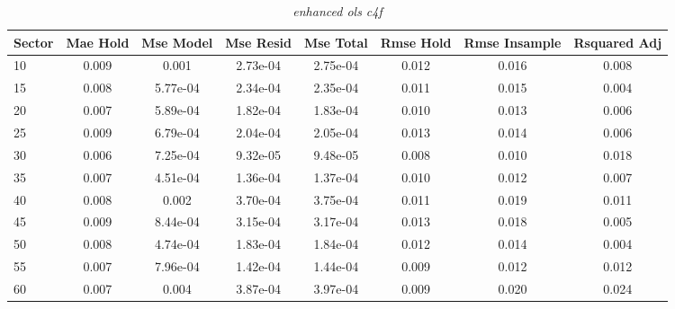 \begin{table}[H]
\caption{\textit{enhanced ols c4f}}\label{tab:enhanced_ols_c4f}
\centering
\begin{tabular}{lccccccc}
\hline\hline
Sector & Mae Hold & Mse Model & Mse Resid & Mse Total & Rmse Hold & Rmse Insample & Rsquared Adj \\ 
\hline
10 & 0.009 & 0.001 & 2.73e-04 & 2.75e-04 & 0.012 & 0.016 & 0.008 \\ 
15 & 0.008 & 5.77e-04 & 2.34e-04 & 2.35e-04 & 0.011 & 0.015 & 0.004 \\ 
20 & 0.007 & 5.89e-04 & 1.82e-04 & 1.83e-04 & 0.010 & 0.013 & 0.006 \\ 
25 & 0.009 & 6.79e-04 & 2.04e-04 & 2.05e-04 & 0.013 & 0.014 & 0.006 \\ 
30 & 0.006 & 7.25e-04 & 9.32e-05 & 9.48e-05 & 0.008 & 0.010 & 0.018 \\ 
35 & 0.007 & 4.51e-04 & 1.36e-04 & 1.37e-04 & 0.010 & 0.012 & 0.007 \\ 
40 & 0.008 & 0.002 & 3.70e-04 & 3.75e-04 & 0.011 & 0.019 & 0.011 \\ 
45 & 0.009 & 8.44e-04 & 3.15e-04 & 3.17e-04 & 0.013 & 0.018 & 0.005 \\ 
50 & 0.008 & 4.74e-04 & 1.83e-04 & 1.84e-04 & 0.012 & 0.014 & 0.004 \\ 
55 & 0.007 & 7.96e-04 & 1.42e-04 & 1.44e-04 & 0.009 & 0.012 & 0.012 \\ 
60 & 0.007 & 0.004 & 3.87e-04 & 3.97e-04 & 0.009 & 0.020 & 0.024 \\ 
\hline
\end{tabular}
\end{table}


